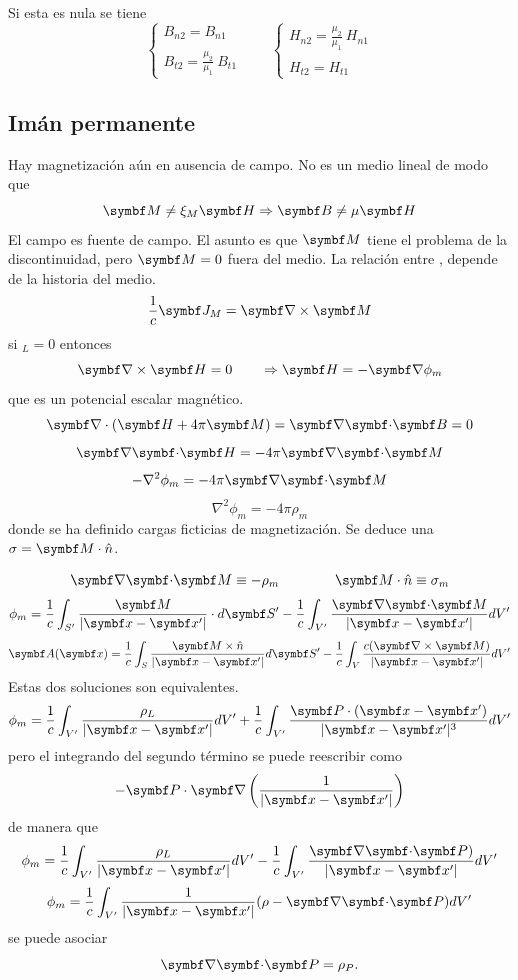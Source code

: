 \documentclass[10pt,oneside]{CBFT_book}
\begin{document}
Si esta es nula se tiene
\[
	\begin{cases}
	B_{n2} = B_{n1} \\
	\\
	\displaystyle B_{t2} = \frac{\mu_2}{\mu_1}\: B_{t1}
	\end{cases}
	\qquad 
	\begin{cases}
	\displaystyle H_{n2} = \frac{\mu_2}{\mu_1}\: H_{n1} \\
	\\
	H_{t2} = H_{t1} 
	\end{cases}
\]

\subsection{Imán permanente}

Hay magnetización  aún en ausencia de campo. No es un medio lineal de modo que
\[
	\vb{M}	 \neq \xi_M \vb{H} \Rightarrow \vb{B} \neq \mu \vb{H}
\]
El campo  es fuente de campo. El asunto es que $\vb{M}$ tiene el problema de
la discontinuidad, pero $ \vb{M} = 0 $ fuera del medio.
La relación entre , depende de la historia del medio.
\[
	\frac{1}{c}\vb{J}_M = \rotorm{M}
\]
si $_L=0$ entonces 
\[
	\rotorm{H} = 0 \qquad \Rightarrow \vb{H} = -\Nabla\phi_m
\]
que es un potencial escalar magnético.
\[
	\Nabla\cdot( \vb{H} + 4\pi\vb{M} ) = \divem{B} = 0
\]
\[
	\divem{H} = -4\pi\divem{M}
\]
\[
	-\nabla^2 \phi_m = -4\pi\divem{M}
\]
\[
	\nabla^2 \phi_m = -4\pi\rho_m
\]
donde se ha definido cargas ficticias de magnetización.
Se deduce una $ \sigma = \vb{M} \cdot \hat{n} $.

\[
	\divem{M} \equiv -\rho_m \qquad \qquad \vb{M}\cdot\hat{n} \equiv \sigma_m
\]
\[
	\phi_m = \frac{1}{c} \int_{S'} \frac{\vb{M}}{|\vb{x}-\vb{x}'|} \cdot d\vb{S}' -
		\frac{1}{c} \int_{V'} \frac{\divem{M}}{|\vb{x}-\vb{x}'|} dV' 
\]
\[
	\vb{A}( \vb{x}) = \frac{1}{c} \int_S \frac{ \vb{M}\times\hat{n} }{|\vb{x}-\vb{x}'|} d\vb{S}' - 
		\frac{1}{c} \int_V \frac{ c(\rotorm{M}) }{|\vb{x}-\vb{x}'|}  dV'
\]
Estas dos soluciones son equivalentes.
\[
	\phi_m = \frac{1}{c} \int_{V'} \frac{\rho_L}{|\vb{x}-\vb{x}'|}  dV' +
		\frac{1}{c} \int_{V'} \frac{ \vb{P}\cdot(\vb{x}-\vb{x}')}{|\vb{x}-\vb{x}'|^3} dV' 
\]
pero el integrando del segundo término se puede reescribir como 
\[
	-\vb{P}\cdot\Nabla\left(\frac{1}{|\vb{x}-\vb{x}'|}\right)
\]
de manera que 
\[
	\phi_m = \frac{1}{c} \int_{V'} \frac{\rho_L}{|\vb{x}-\vb{x}'|}  dV' -
		\frac{1}{c} \int_{V'} \frac{ \divem{P}) }{|\vb{x}-\vb{x}'|} dV' 
\]
\[
	\phi_m = \frac{1}{c} \int_{V'} \frac{1}{|\vb{x}-\vb{x}'|}( \rho - \divem{P} )  dV'
\]
se puede asociar
\[
	\divem{P} = \rho_P.
\]
\end{document}
